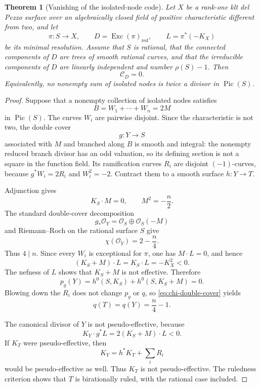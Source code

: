\documentclass[11pt,reqno]{amsart}
\newtheorem{theorem}{Theorem}[section]
\theoremstyle{definition}
\theoremstyle{remark}
\DeclareMathOperator{\Exc}{Exc}
\DeclareMathOperator{\Pic}{Pic}
\newcommand{\cO}{\mathcal O}
\numberwithin{equation}{section}
\begin{document}
\begin{theorem}[Vanishing of the isolated-node code]\label{thm:no-even-nodes}
Let $X$ be a rank-one klt del Pezzo surface over an algebraically closed field of positive characteristic different from two, and let
\[
  \pi:S\longrightarrow X,
  \qquad D=\Exc(\pi)_{\mathrm{red}},
  \qquad L=\pi^*(-K_X)
\]
be its minimal resolution.  Assume that $S$ is rational, that the connected components of $D$ are trees of smooth rational curves, and that the irreducible components of $D$ are linearly independent and number $\rho(S)-1$.  Then
\[
  \mathcal C_D=0.
\]
Equivalently, no nonempty sum of isolated nodes is twice a divisor in $\Pic(S)$.
\end{theorem}

\begin{proof}
Suppose that a nonempty collection of isolated nodes satisfies
\[
  B=W_1+\cdots+W_n=2M
\]
in $\Pic(S)$.  The curves $W_i$ are pairwise disjoint.  Since the characteristic is not two, the double cover
\[
  g:Y\longrightarrow S
\]
associated with $M$ and branched along $B$ is smooth and integral: the nonempty reduced branch divisor has an odd valuation, so its defining section is not a square in the function field.  Its ramification curves $R_i$ are disjoint $(-1)$-curves, because $g^*W_i=2R_i$ and $W_i^2=-2$.  Contract them to a smooth surface $h:Y\to T$.

Adjunction gives
\[
  K_S\cdot M=0,
  \qquad M^2=-\frac n2.
\]
The standard double-cover decomposition
\[
  g_*\cO_Y=\cO_S\oplus\cO_S(-M)
\]
and Riemann--Roch on the rational surface $S$ give
\begin{equation}\label{eq:chi-double-cover}
  \chi(\cO_Y)=2-\frac n4.
\end{equation}
Thus $4\mid n$.  Since every $W_i$ is exceptional for $\pi$, one has $M\cdot L=0$, and hence
\[
  (K_S+M)\cdot L=K_S\cdot L=-K_X^2<0.
\]
The nefness of $L$ shows that $K_S+M$ is not effective.  Therefore
\[
  p_g(Y)=h^0(S,K_S)+h^0(S,K_S+M)=0.
\]
Blowing down the $R_i$ does not change $p_g$ or $q$, so \eqref{eq:chi-double-cover} yields
\begin{equation}\label{eq:qT}
  q(T)=q(Y)=\frac n4-1.
\end{equation}

The canonical divisor of $Y$ is not pseudo-effective, because
\[
  K_Y\cdot g^*L=2(K_S+M)\cdot L<0.
\]
If $K_T$ were pseudo-effective, then
\[
  K_Y=h^*K_T+\sum_iR_i
\]
would be pseudo-effective as well.  Thus $K_T$ is not pseudo-effective.  The ruledness criterion
\cite[Theorem~2.1\textup{(I)}]{CataneseLi} shows that $T$ is birationally
ruled, with the rational case included.


\end{proof}
\end{document}
